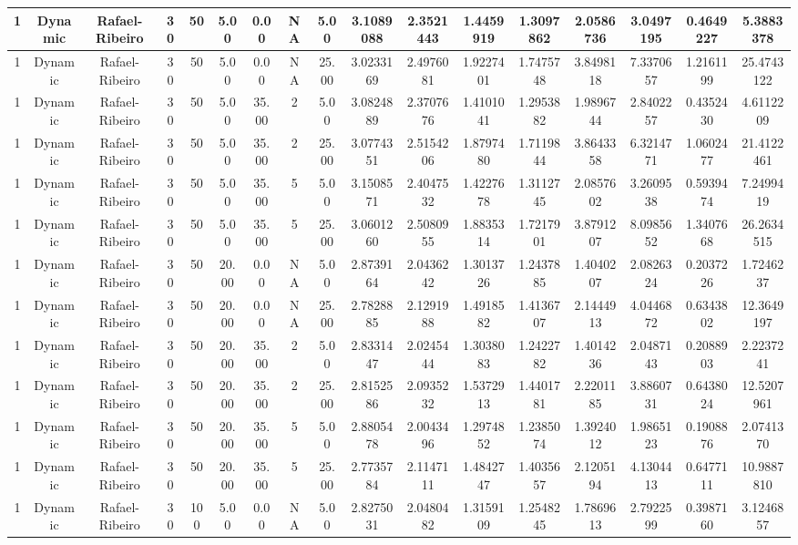 \begin{longtable}{ | c | c | c | c | c | c | c | c | c | c | c | c | c | c | c | c | c | }
	\hline
	1	&	Dynamic	&	Rafael-Ribeiro	&	30	&	50	&	5.00	&	0.00	&	NA	&	5.00	&	3.1089088	&	2.3521443	&	1.4459919	&	1.3097862	&	2.0586736	&	3.0497195	&	0.4649227	&	5.3883378 \\
	\hline
	1	&	Dynamic	&	Rafael-Ribeiro	&	30	&	50	&	5.00	&	0.00	&	NA	&	25.00	&	3.0233169	&	2.4976081	&	1.9227401	&	1.7475748	&	3.8498118	&	7.3370657	&	1.2161199	&	25.4743122 \\
	\hline
	1	&	Dynamic	&	Rafael-Ribeiro	&	30	&	50	&	5.00	&	35.00	&	2	&	5.00	&	3.0824889	&	2.3707676	&	1.4101041	&	1.2953882	&	1.9896744	&	2.8402257	&	0.4352430	&	4.6112209 \\
	\hline
	1	&	Dynamic	&	Rafael-Ribeiro	&	30	&	50	&	5.00	&	35.00	&	2	&	25.00	&	3.0774351	&	2.5154206	&	1.8797480	&	1.7119844	&	3.8643358	&	6.3214771	&	1.0602477	&	21.4122461 \\
	\hline
	1	&	Dynamic	&	Rafael-Ribeiro	&	30	&	50	&	5.00	&	35.00	&	5	&	5.00	&	3.1508571	&	2.4047532	&	1.4227678	&	1.3112745	&	2.0857602	&	3.2609538	&	0.5939474	&	7.2499419 \\
	\hline
	1	&	Dynamic	&	Rafael-Ribeiro	&	30	&	50	&	5.00	&	35.00	&	5	&	25.00	&	3.0601260	&	2.5080955	&	1.8835314	&	1.7217901	&	3.8791207	&	8.0985652	&	1.3407668	&	26.2634515 \\
	\hline
	1	&	Dynamic	&	Rafael-Ribeiro	&	30	&	50	&	20.00	&	0.00	&	NA	&	5.00	&	2.8739164	&	2.0436242	&	1.3013726	&	1.2437885	&	1.4040207	&	2.0826324	&	0.2037226	&	1.7246237 \\
	\hline
	1	&	Dynamic	&	Rafael-Ribeiro	&	30	&	50	&	20.00	&	0.00	&	NA	&	25.00	&	2.7828885	&	2.1291988	&	1.4918582	&	1.4136707	&	2.1444913	&	4.0446872	&	0.6343802	&	12.3649197 \\
	\hline
	1	&	Dynamic	&	Rafael-Ribeiro	&	30	&	50	&	20.00	&	35.00	&	2	&	5.00	&	2.8331447	&	2.0245444	&	1.3038083	&	1.2422782	&	1.4014236	&	2.0487143	&	0.2088903	&	2.2237241 \\
	\hline
	1	&	Dynamic	&	Rafael-Ribeiro	&	30	&	50	&	20.00	&	35.00	&	2	&	25.00	&	2.8152586	&	2.0935232	&	1.5372913	&	1.4401781	&	2.2201185	&	3.8860731	&	0.6438024	&	12.5207961 \\
	\hline
	1	&	Dynamic	&	Rafael-Ribeiro	&	30	&	50	&	20.00	&	35.00	&	5	&	5.00	&	2.8805478	&	2.0043496	&	1.2974852	&	1.2385074	&	1.3924012	&	1.9865123	&	0.1908876	&	2.0741370 \\
	\hline
	1	&	Dynamic	&	Rafael-Ribeiro	&	30	&	50	&	20.00	&	35.00	&	5	&	25.00	&	2.7735784	&	2.1147111	&	1.4842747	&	1.4035657	&	2.1205194	&	4.1304413	&	0.6477111	&	10.9887810 \\
	\hline
	1	&	Dynamic	&	Rafael-Ribeiro	&	30	&	100	&	5.00	&	0.00	&	NA	&	5.00	&	2.8275031	&	2.0480482	&	1.3159109	&	1.2548245	&	1.7869613	&	2.7922599	&	0.3987160	&	3.1246857 \\

\end{longtable}

